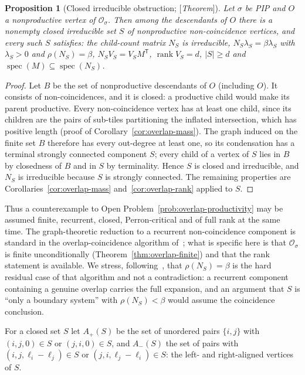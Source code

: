 \documentclass[11pt]{amsart}
\theoremstyle{plain}
\newtheorem{proposition}[theorem]{Proposition}
\theoremstyle{definition}
\theoremstyle{remark}
\newcommand{\rank}{\operatorname{rank}}
\newcommand{\spec}{\operatorname{spec}}
\newcommand{\Status}[1]{\textup{[\textit{#1}]}}
\begin{document}
\begin{proposition}[Closed irreducible obstruction; \Status{Theorem}]\label{prop:obstruction-normal-form}
Let $\sigma$ be PIP and $O$ a nonproductive vertex of $\mathcal O_\sigma$. Then among the descendants of $O$ there is a nonempty closed irreducible set $S$ of nonproductive non-coincidence vertices, and every such $S$ satisfies: the child-count matrix $N_S$ is irreducible, $N_S\lambda_S=\beta\lambda_S$ with $\lambda_S>0$ and $\rho(N_S)=\beta$, $N_SV_S=V_SM^{\mathsf T}$, $\rank V_S=d$, $|S|\ge d$ and $\spec(M)\subseteq\spec(N_S)$.
\end{proposition}
\begin{proof}
Let $B$ be the set of nonproductive descendants of $O$ (including $O$). It consists of non-coincidences, and it is closed: a productive child would make its parent productive. Every non-coincidence vertex has at least one child, since its children are the pairs of sub-tiles partitioning the inflated intersection, which has positive length (proof of Corollary~\ref{cor:overlap-mass}). The graph induced on the finite set $B$ therefore has every out-degree at least one, so its condensation has a terminal strongly connected component $S$; every child of a vertex of $S$ lies in $B$ by closedness of $B$ and in $S$ by terminality. Hence $S$ is closed and irreducible, and $N_S$ is irreducible because $S$ is strongly connected. The remaining properties are Corollaries~\ref{cor:overlap-mass} and~\ref{cor:overlap-rank} applied to $S$.
\end{proof}

Thus a counterexample to Open Problem~\ref{prob:overlap-productivity} may be assumed finite, recurrent, closed, Perron-critical and of full rank at the same time. The graph-theoretic reduction to a recurrent non-coincidence component is standard in the overlap-coincidence algorithm of~\cite{AL}; what is specific here is that $\mathcal O_\sigma$ is finite unconditionally (Theorem~\ref{thm:overlap-finite}) and that the rank statement is available. We stress, following~\cite[Thm.~4.1]{AL}, that $\rho(N_S)=\beta$ is the hard residual case of that algorithm and not a contradiction: a recurrent component containing a genuine overlap carries the full expansion, and an argument that $S$ is ``only a boundary system'' with $\rho(N_S)<\beta$ would assume the coincidence conclusion.

For a closed set $S$ let $A_+(S)$ be the set of unordered pairs $\{i,j\}$ with $(i,j,0)\in S$ or $(j,i,0)\in S$, and $A_-(S)$ the set of pairs with $(i,j,\ell_i-\ell_j)\in S$ or $(j,i,\ell_j-\ell_i)\in S$: the left- and right-aligned vertices of $S$.
\end{document}
